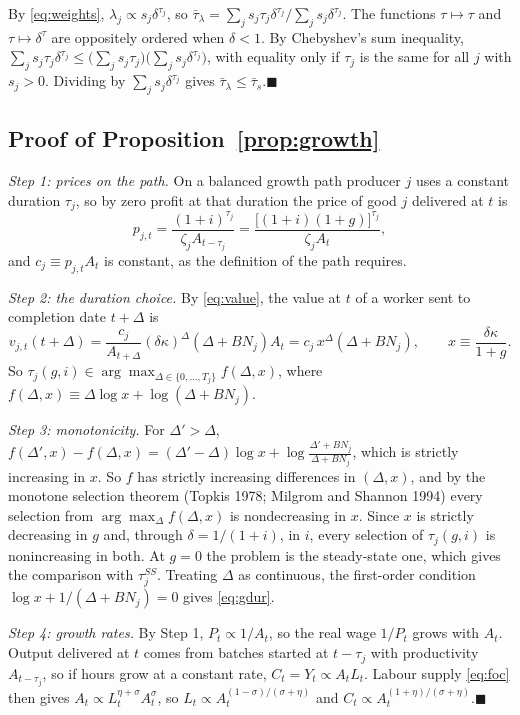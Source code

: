 \documentclass[11pt]{article}
\theoremstyle{definition}
\begin{document}
By \eqref{eq:weights}, $\lambda_j\propto s_j\delta^{\tau_j}$, so
$\bar\tau_\lambda=\sum_js_j\tau_j\delta^{\tau_j}/\sum_js_j\delta^{\tau_j}$. The functions $\tau\mapsto\tau$
and $\tau\mapsto\delta^{\tau}$ are oppositely ordered when $\delta<1$. By Chebyshev's sum inequality,
$\sum_js_j\tau_j\delta^{\tau_j}\le\bigl(\sum_js_j\tau_j\bigr)\bigl(\sum_js_j\delta^{\tau_j}\bigr)$, with
equality only if $\tau_j$ is the same for all $j$ with $s_j>0$. Dividing by $\sum_js_j\delta^{\tau_j}$
gives $\bar\tau_\lambda\le\bar\tau_s$.\hfill$\blacksquare$

\subsection{Proof of Proposition~\ref{prop:growth}}\label{app:pf_growth}

\emph{Step 1: prices on the path.} On a balanced growth path producer $j$ uses a constant duration
$\tau_j$, so by zero profit at that duration the price of good $j$ delivered at $t$ is
\[
  p_{j,t}=\frac{(1+i)^{\tau_j}}{\zeta_jA_{t-\tau_j}}=\frac{\bigl[(1+i)(1+g)\bigr]^{\tau_j}}{\zeta_jA_t},
\]
and $c_j\equiv p_{j,t}A_t$ is constant, as the definition of the path requires.

\emph{Step 2: the duration choice.} By \eqref{eq:value}, the value at $t$ of a worker sent to
completion date $t+\Delta$ is
\[
  v_{j,t}(t+\Delta)=\frac{c_j}{A_{t+\Delta}}(\delta\kappa)^{\Delta}(\Delta+BN_j)A_t
  =c_j\,x^{\Delta}(\Delta+BN_j),\qquad x\equiv\frac{\delta\kappa}{1+g}.
\]
So $\tau_j(g,i)\in\arg\max_{\Delta\in\{0,\dots,T_j\}}f(\Delta,x)$, where
$f(\Delta,x)\equiv\Delta\log x+\log(\Delta+BN_j)$.

\emph{Step 3: monotonicity.} For $\Delta'>\Delta$,
$f(\Delta',x)-f(\Delta,x)=(\Delta'-\Delta)\log x+\log\frac{\Delta'+BN_j}{\Delta+BN_j}$, which is strictly
increasing in $x$. So $f$ has strictly increasing differences in $(\Delta,x)$, and by the monotone
selection theorem (Topkis 1978; Milgrom and Shannon 1994) every selection from
$\arg\max_\Delta f(\Delta,x)$ is nondecreasing in $x$. Since $x$ is strictly decreasing in $g$ and,
through $\delta=1/(1+i)$, in $i$, every selection of $\tau_j(g,i)$ is nonincreasing in both. At
$g=0$ the problem is the steady-state one, which gives the comparison with $\tau_j^{SS}$. Treating
$\Delta$ as continuous, the first-order condition $\log x+1/(\Delta+BN_j)=0$ gives \eqref{eq:gdur}.

\emph{Step 4: growth rates.} By Step 1, $P_t\propto1/A_t$, so the real wage $1/P_t$ grows with
$A_t$. Output delivered at $t$ comes from batches started at $t-\tau_j$ with productivity
$A_{t-\tau_j}$, so if hours grow at a constant rate, $C_t=Y_t\propto A_tL_t$. Labour supply
\eqref{eq:foc} then gives $A_t\propto L_t^{\eta+\sigma}A_t^{\sigma}$, so
$L_t\propto A_t^{(1-\sigma)/(\sigma+\eta)}$ and $C_t\propto A_t^{(1+\eta)/(\sigma+\eta)}$.\hfill$\blacksquare$
\end{document}
